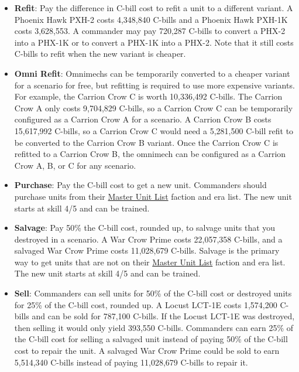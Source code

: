 \documentclass{article}
\begin{document}
\begin{itemize}
\item {\bf Refit}: Pay the difference in C-bill cost to refit a unit to a different variant.
A Phoenix Hawk PXH-2 costs 4,348,840 C-bills and a Phoenix Hawk PXH-1K costs 3,628,553.
A commander may pay 720,287 C-bills to convert a PHX-2 into a PHX-1K or to convert a PHX-1K into a PHX-2.
Note that it still costs C-bills to refit when the new variant is cheaper.

\item {\bf Omni Refit}: Omnimechs can be temporarily converted to a cheaper variant for a scenario for free, but refitting is required to use more expensive variants.
For example, the Carrion Crow C is worth 10,336,492 C-bills.
The Carrion Crow A only costs 9,704,829 C-bills, so a Carrion Crow C can be temporarily configured as a Carrion Crow A for a scenario.
A Carrion Crow B costs 15,617,992 C-bills, so a Carrion Crow C would need a 5,281,500 C-bill refit to be converted to the Carrion Crow B variant.
Once the Carrion Crow C is refitted to a Carrion Crow B, the omnimech can be configured as a Carrion Crow A, B, or C for any scenario.

\item {\bf Purchase}: Pay the C-bill cost to get a new unit.
Commanders should purchase units from their \href{http://www.masterunitlist.info}{Master Unit List} faction and era list.
The new unit starts at skill 4/5 and can be trained.

\item {\bf Salvage}: Pay 50\% the C-bill cost, rounded up, to salvage units that you destroyed in a scenario.
A War Crow Prime costs 22,057,358 C-bills, and a salvaged War Crow Prime costs 11,028,679 C-bills.
Salvage is the primary way to get units that are not on their \href{http://www.masterunitlist.info}{Master Unit List} faction and era list.
The new unit starts at skill 4/5 and can be trained.

\item {\bf Sell}: Commanders can sell units for 50\% of the C-bill cost or destroyed units for 25\% of the C-bill cost, rounded up.
A Locust LCT-1E costs 1,574,200 C-bills and can be sold for 787,100 C-bills.
If the Locust LCT-1E was destroyed, then selling it would only yield 393,550 C-bills.
Commanders can earn 25\% of the C-bill cost for selling a salvaged unit instead of paying 50\% of the C-bill cost to repair the unit.
A salvaged War Crow Prime could be sold to earn 5,514,340 C-bills instead of paying 11,028,679 C-bills to repair it.

\end{itemize}
\end{document}
